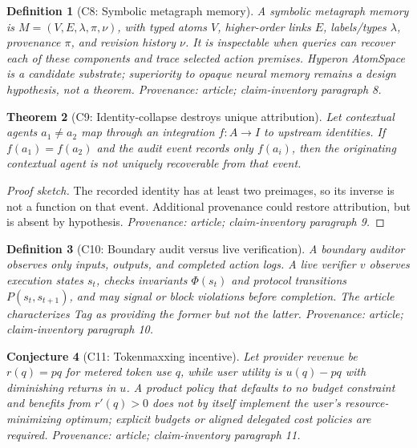 \documentclass[11pt,a4paper]{article}
\newtheorem{definition}{Definition}[section]
\newtheorem{theorem}[definition]{Theorem}
\newtheorem{conjecture}[definition]{Conjecture}
\begin{document}
\begin{definition}[C8: Symbolic metagraph memory]
A symbolic metagraph memory is $M=(V,E,\lambda,\pi,\nu)$, with typed atoms
$V$, higher-order links $E$, labels/types $\lambda$, provenance $\pi$, and
revision history $\nu$.  It is inspectable when queries can recover each of
these components and trace selected action premises.  Hyperon AtomSpace is a
candidate substrate; superiority to opaque neural memory remains a design
hypothesis, not a theorem.  \emph{Provenance: article; claim-inventory
paragraph 8.}
\end{definition}

\begin{theorem}[C9: Identity-collapse destroys unique attribution]
Let contextual agents $a_1\neq a_2$ map through an integration
$f:A\rightarrow I$ to upstream identities.  If $f(a_1)=f(a_2)$ and the audit
event records only $f(a_i)$, then the originating contextual agent is not
uniquely recoverable from that event.
\end{theorem}
\begin{proof}[Proof sketch]
The recorded identity has at least two preimages, so its inverse is not a
function on that event.  Additional provenance could restore attribution,
but is absent by hypothesis.  \emph{Provenance: article; claim-inventory
paragraph 9.}
\end{proof}

\begin{definition}[C10: Boundary audit versus live verification]
A boundary auditor observes only inputs, outputs, and completed action logs.
A live verifier $v$ observes execution states $s_t$, checks invariants
$\Phi(s_t)$ and protocol transitions $P(s_t,s_{t+1})$, and may signal or block
violations before completion.  The article characterizes Tag as providing
the former but not the latter.  \emph{Provenance: article; claim-inventory
paragraph 10.}
\end{definition}

\begin{conjecture}[C11: Tokenmaxxing incentive]
Let provider revenue be $r(q)=pq$ for metered token use $q$, while user utility
is $u(q)-pq$ with diminishing returns in $u$.  A product policy that defaults
to no budget constraint and benefits from $r'(q)>0$ does not by itself
implement the user's resource-minimizing optimum; explicit budgets or aligned
delegated cost policies are required.  \emph{Provenance: article;
claim-inventory paragraph 11.}
\end{conjecture}
\end{document}
